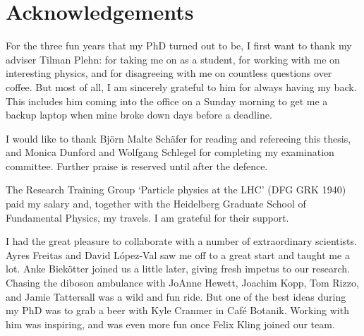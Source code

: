 
\chapter*{Acknowledgements}




For the three fun years that my PhD turned out to be, I first want to
thank my adviser Tilman Plehn: for taking me on as a student, for
working with me on interesting physics, and for disagreeing with me on
countless questions over coffee. But most of all, I am sincerely
grateful to him for always having my back. This includes him coming
into the office on a Sunday morning to get me a backup laptop when
mine broke down days before a deadline.
%
%
%

I would like to thank Bj\"orn Malte Sch\"afer for reading and
refereeing this thesis, and Monica Dunford and Wolfgang Schlegel for
completing my examination committee. Further praise is reserved until
after the defence.

The Research Training Group `Particle physics at the LHC' (DFG GRK
1940) paid my salary and, together with the Heidelberg Graduate School
of Fundamental Physics, my travels. I am grateful for their support.

I had the great pleasure to collaborate with a number of extraordinary
scientists. Ayres Freitas and David L\'opez-Val saw me off to a great
start and taught me a lot. Anke Biek\"otter joined us a little later,
giving fresh impetus to our research. Chasing the diboson ambulance
with JoAnne Hewett, Joachim Kopp, Tom Rizzo, and Jamie Tattersall was
a wild and fun ride. But one of the best ideas during my PhD was to
grab a beer with Kyle Cranmer in Caf\'e Botanik. Working with him was
inspiring, and was even more fun once Felix Kling joined our team.

